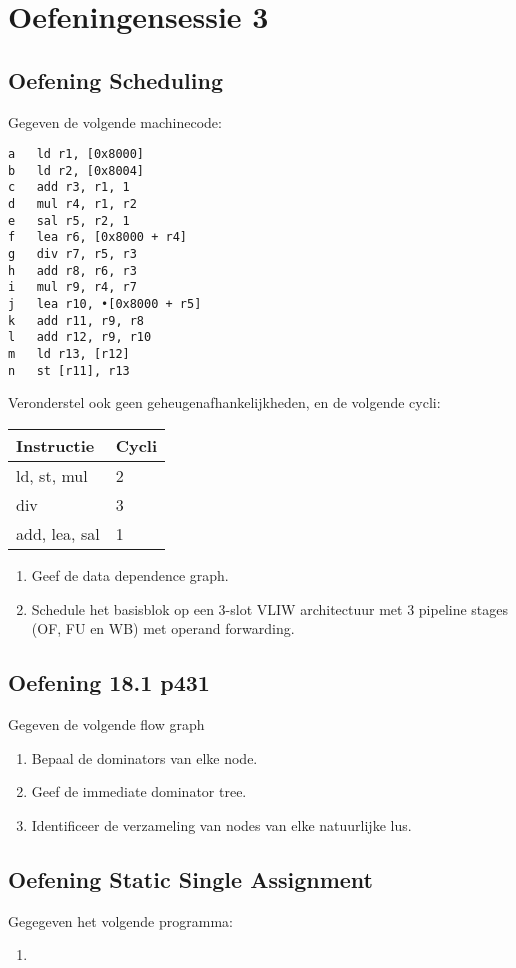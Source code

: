 \chapter{Oefeningensessie 3}


\section{Oefening Scheduling}

Gegeven de volgende machinecode:
\begin{lstlisting}
a	ld r1, [0x8000]
b	ld r2, [0x8004]
c	add r3, r1, 1
d	mul r4, r1, r2
e	sal r5, r2, 1
f	lea r6, [0x8000 + r4]
g	div r7, r5, r3
h	add r8, r6, r3
i	mul	r9, r4, r7
j	lea r10, •[0x8000 + r5]
k	add r11, r9, r8
l	add r12, r9, r10
m	ld r13, [r12]
n	st [r11], r13
\end{lstlisting}
Veronderstel ook geen geheugenafhankelijkheden, en de volgende cycli:
\begin{table}
	\begin{tabular}{| l | l |}
		\hline 
		\textbf{Instructie} & \textbf{Cycli} \\
		\hline
		ld, st, mul & 2 \\
		div & 3 \\
		add, lea, sal & 1
	\end{tabular}
\end{table}

\begin{enumerate}
	\item Geef de data dependence graph.
	\item Schedule het basisblok op een 3-slot VLIW architectuur met 3 pipeline stages (OF, FU en WB) met operand forwarding.
	
\end{enumerate}

\section{Oefening 18.1 p431}
Gegeven de volgende flow graph

\begin{enumerate}
	\item Bepaal de dominators van elke node.
	\item Geef de immediate dominator tree.
	\item Identificeer de verzameling van nodes van elke natuurlijke lus.
\end{enumerate}

\section{Oefening Static Single Assignment}
Gegegeven het volgende programma:




\begin{enumerate}
	\item 
\end{enumerate}